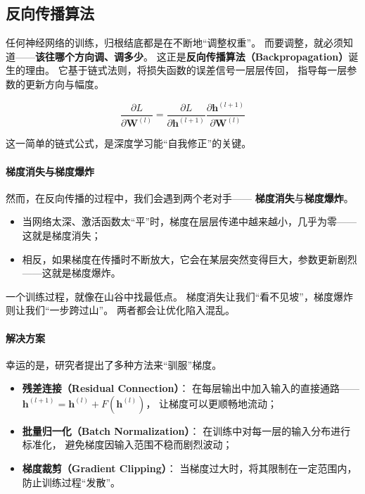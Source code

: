 \subsection{反向传播算法}

任何神经网络的训练，归根结底都是在不断地“调整权重”。  
而要调整，就必须知道——\textbf{该往哪个方向调、调多少}。  
这正是\textbf{反向传播算法（Backpropagation）}诞生的理由。  
它基于链式法则，将损失函数的误差信号一层层传回，  
指导每一层参数的更新方向与幅度。

$$\frac{\partial L}{\partial \mathbf{W}^{(l)}} = \frac{\partial L}{\partial \mathbf{h}^{(l+1)}} \frac{\partial \mathbf{h}^{(l+1)}}{\partial \mathbf{W}^{(l)}}$$

这一简单的链式公式，是深度学习能“自我修正”的关键。

\paragraph{梯度消失与梯度爆炸}  
然而，在反向传播的过程中，我们会遇到两个老对手——  
\textbf{梯度消失}与\textbf{梯度爆炸}。

\begin{itemize}
\item 当网络太深、激活函数太“平”时，梯度在层层传递中越来越小，几乎为零——这就是梯度消失；
\item 相反，如果梯度在传播时不断放大，它会在某层突然变得巨大，参数更新剧烈——这就是梯度爆炸。
\end{itemize}

一个训练过程，就像在山谷中找最低点。  
梯度消失让我们“看不见坡”，梯度爆炸则让我们“一步跨过山”。  
两者都会让优化陷入混乱。

\paragraph{解决方案}  
幸运的是，研究者提出了多种方法来“驯服”梯度。  

\begin{itemize}
\item \textbf{残差连接（Residual Connection）}：  
在每层输出中加入输入的直接通路——$\mathbf{h}^{(l+1)} = \mathbf{h}^{(l)} + F(\mathbf{h}^{(l)})$，  
让梯度可以更顺畅地流动；
\item \textbf{批量归一化（Batch Normalization）}：  
在训练中对每一层的输入分布进行标准化，  
避免梯度因输入范围不稳而剧烈波动；
\item \textbf{梯度裁剪（Gradient Clipping）}：  
当梯度过大时，将其限制在一定范围内，  
防止训练过程“发散”。
\end{itemize}

